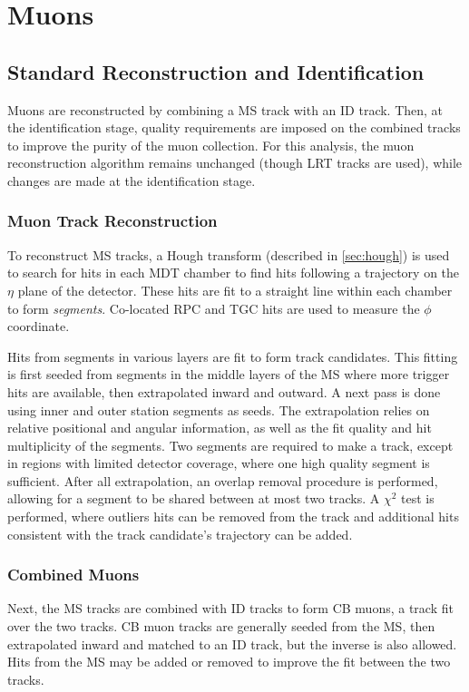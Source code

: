 \section{Muons}
\label{sec:muonreco}
\subsection{Standard Reconstruction and Identification}

Muons are reconstructed by combining a \ac{MS} track with an \ac{ID} track. Then, at the identification stage, quality requirements are imposed on the combined tracks to improve the purity of the muon collection. For this analysis, the muon reconstruction algorithm remains unchanged (though \ac{LRT} tracks are used), while changes are made at the identification stage.

\subsubsection{Muon Track Reconstruction}
To reconstruct \ac{MS} tracks, a Hough transform (described in \autoref{sec:hough}) is used to search for hits in each \ac{MDT} chamber to find hits following a trajectory on the $\eta$ plane of the detector. These hits are fit to a straight line within each chamber to form \emph{segments}. Co-located \ac{RPC} and \ac{TGC} hits are used to measure the $\phi$ coordinate. 

Hits from segments in various layers are fit to form track candidates. This fitting is first seeded from segments in the middle layers of the \ac{MS} where more trigger hits are available, then extrapolated inward and outward. A next pass is done using inner and outer station segments as seeds. The extrapolation relies on relative positional and angular information, as well as the fit quality and hit multiplicity of the segments. Two segments are required to make a track, except in regions with limited detector coverage, where one high quality segment is sufficient. After all extrapolation, an overlap removal procedure is performed, allowing for a segment to be shared between at most two tracks. A $\chi^{2}$ test is performed, where outliers hits can be removed from the track and additional hits consistent with the track candidate's trajectory can be added.



\subsubsection{Combined Muons}
Next, the \ac{MS} tracks are combined with \ac{ID} tracks to form \ac{CB} muons, a track fit over the two tracks. \ac{CB} muon tracks are generally seeded from the \ac{MS}, then extrapolated inward and matched to an \ac{ID} track, but the inverse is also allowed. Hits from the \ac{MS} may be added or removed to improve the fit between the two tracks.



